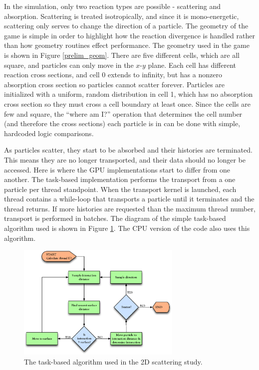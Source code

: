 In the simulation, only two reaction types are possible - scattering and absorption.  Scattering is treated isotropically, and since it is mono-energetic, scattering only serves to change the direction of a particle.  The geometry of the game is simple in order to highlight how the reaction divergence is handled rather than how geometry routines effect performance.   The geometry used in the game is shown in Figure \ref{prelim_geom}.  There are five different cells, which are all square, and particles can only move in the $x$-$y$ plane.  Each cell has different reaction cross sections, and cell 0 extends to infinity, but has a nonzero absorption cross section so particles cannot scatter forever.  Particles are initialized with a uniform, random distribution in cell 1, which has no absorption cross section so they must cross a cell boundary at least once.  Since the cells are few and square, the ``where am I?'' operation that determines the cell number (and therefore the cross sections) each particle is in can be done with simple, hardcoded logic comparisons.

As particles scatter, they start to be absorbed and their histories are terminated.  This means they are no longer transported, and their data should no longer be accessed.  Here is where the GPU implementations start to differ from one another.  The task-based implementation performs the transport from a one particle per thread standpoint.  When the transport kernel is launched, each thread contains a while-loop that transports a particle until it terminates and the thread returns.  If more histories are requested than the maximum thread number, transport is performed in batches.  The diagram of the simple task-based algorithm used is shown in Figure \ref{prelim_alg_task}.  The CPU version of the code also uses this algorithm.

\begin{figure}[h!] 
  \centering
    \includegraphics[width=0.7\textwidth]{graphics/prelim_alg_task.eps}
     \caption{The task-based algorithm used in the 2D scattering study. \label{prelim_alg_task} }
\end{figure}

